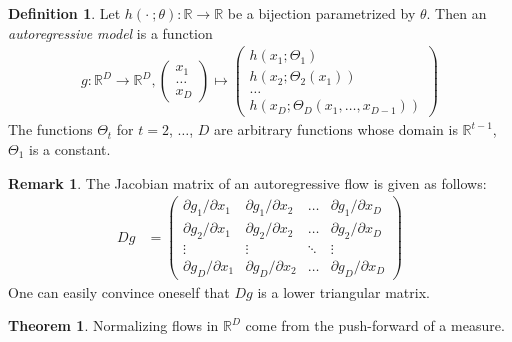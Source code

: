 \documentclass[12pt, a4paper]{article}
\numberwithin{equation}{section}
\theoremstyle{definition}
\theoremstyle{definition}
\newtheorem{defn}[thm]{Definition} %
\newtheorem{remark}[thm]{Remark} %
\newtheorem{theorem}[thm]{Theorem}
\begin{document}
	\begin{defn}
		Let $h(\bm{\cdot}\ ; \theta): \mathbb{R}\rightarrow\mathbb{R}$ be a bijection parametrized by $\theta$. Then an \textit{autoregressive model} is a function \begin{align}
			g: \mathbb{R}^D\rightarrow\mathbb{R}^D, \begin{pmatrix}
				x_1 \\ \dots \\ x_D 
			\end{pmatrix} \mapsto 
			\begin{pmatrix}
				h\left(x_1; \Theta_1\right) \\ h\left(x_2; 	\Theta_2\left(x_1\right)\right) \\ \dots \\ h\left(x_D; \Theta_D\left(x_1, \dots, x_{D-1}\right)\right)
			\end{pmatrix}
		\end{align}
		The functions $\Theta_t$ for $t = 2$, $\dots$, $D$ are arbitrary functions whose domain is $\mathbb{R}^{t-1}$, $\Theta_1$ is a constant. 
	\end{defn}

	\begin{remark}
		The Jacobian matrix of an autoregressive flow is given as follows: 
		\begin{align}
			Dg &= \begin{pmatrix}
				\partial g_1/\partial x_1 & \partial g_1/\partial x_2 & \dots & \partial g_1/\partial x_D 
								\\ 
				\partial g_2/\partial x_1 & \partial g_2/\partial x_2 & \dots & \partial g_2/\partial x_D
								\\
				\vdots & \vdots & \ddots & \vdots 
								\\ 
				\partial g_D/\partial x_1 & \partial g_D / \partial x_2 & \dots & \partial g_D / \partial x_D
			\end{pmatrix} 
		\end{align}
	One can easily convince oneself that $Dg$ is a lower triangular matrix. 
	\end{remark}

	\begin{theorem}
		Normalizing flows in $\mathbb{R}^D$ come from the push-forward of a measure. 
	\end{theorem}
	
\end{document}
